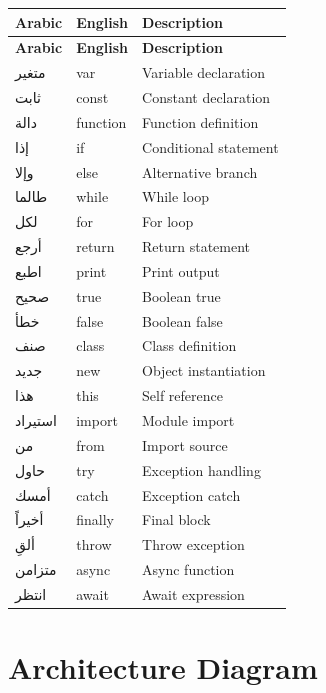 \documentclass[11pt,a4paper]{article}
\begin{document}
\begin{longtable}{@{}llp{6cm}@{}}
\toprule
\textbf{Arabic} & \textbf{English} & \textbf{Description} \\
\midrule
\endfirsthead
\toprule
\textbf{Arabic} & \textbf{English} & \textbf{Description} \\
\midrule
\endhead
\bottomrule
\endfoot

\textarabic{متغير} & var & Variable declaration \\
\textarabic{ثابت} & const & Constant declaration \\
\textarabic{دالة} & function & Function definition \\
\textarabic{إذا} & if & Conditional statement \\
\textarabic{وإلا} & else & Alternative branch \\
\textarabic{طالما} & while & While loop \\
\textarabic{لكل} & for & For loop \\
\textarabic{أرجع} & return & Return statement \\
\textarabic{اطبع} & print & Print output \\
\textarabic{صحيح} & true & Boolean true \\
\textarabic{خطأ} & false & Boolean false \\
\textarabic{صنف} & class & Class definition \\
\textarabic{جديد} & new & Object instantiation \\
\textarabic{هذا} & this & Self reference \\
\textarabic{استيراد} & import & Module import \\
\textarabic{من} & from & Import source \\
\textarabic{حاول} & try & Exception handling \\
\textarabic{أمسك} & catch & Exception catch \\
\textarabic{أخيراً} & finally & Final block \\
\textarabic{ألقِ} & throw & Throw exception \\
\textarabic{متزامن} & async & Async function \\
\textarabic{انتظر} & await & Await expression \\

\end{longtable}

\section{Architecture Diagram}
\label{app:architecture}
\end{document}
